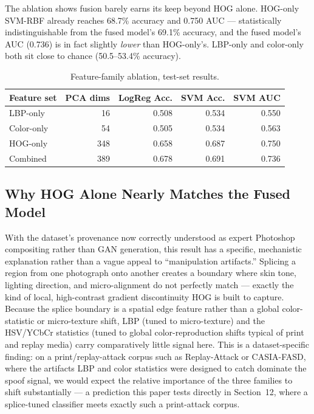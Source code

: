 \documentclass[11pt]{article}
\begin{document}
The ablation shows fusion barely earns its keep beyond HOG alone. HOG-only SVM-RBF already reaches 68.7\% accuracy and 0.750 AUC --- statistically indistinguishable from the fused model's 69.1\% accuracy, and the fused model's AUC (0.736) is in fact slightly \emph{lower} than HOG-only's. LBP-only and color-only both sit close to chance (50.5--53.4\% accuracy).

\begin{table}[htbp]
\centering
\caption{Feature-family ablation, test-set results.}
\label{tab:ablation}
\begin{tabular}{lrrrr}
\toprule
Feature set & PCA dims & LogReg Acc. & SVM Acc. & SVM AUC \\
\midrule
LBP-only & 16 & 0.508 & 0.534 & 0.550 \\
Color-only & 54 & 0.505 & 0.534 & 0.563 \\
HOG-only & 348 & 0.658 & 0.687 & 0.750 \\
Combined & 389 & 0.678 & 0.691 & 0.736 \\
\bottomrule
\end{tabular}
\end{table}

\subsection{Why HOG Alone Nearly Matches the Fused Model}

With the dataset's provenance now correctly understood as expert Photoshop compositing rather than GAN generation, this result has a specific, mechanistic explanation rather than a vague appeal to ``manipulation artifacts.'' Splicing a region from one photograph onto another creates a boundary where skin tone, lighting direction, and micro-alignment do not perfectly match --- exactly the kind of local, high-contrast gradient discontinuity HOG is built to capture. Because the splice boundary is a spatial edge feature rather than a global color-statistic or micro-texture shift, LBP (tuned to micro-texture) and the HSV/YCbCr statistics (tuned to global color-reproduction shifts typical of print and replay media) carry comparatively little signal here. This is a dataset-specific finding: on a print/replay-attack corpus such as Replay-Attack or CASIA-FASD, where the artifacts LBP and color statistics were designed to catch dominate the spoof signal, we would expect the relative importance of the three families to shift substantially --- a prediction this paper tests directly in Section~12, where a splice-tuned classifier meets exactly such a print-attack corpus.
\end{document}
